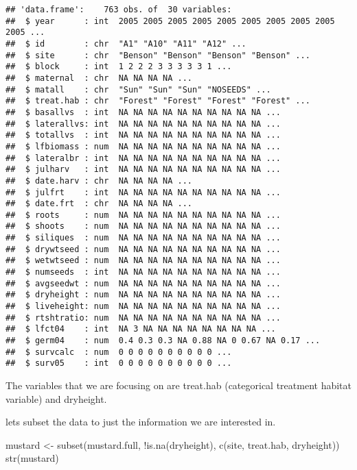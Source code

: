 \documentclass[
]{article}
\newenvironment{Shaded}{\begin{snugshade}}{\end{snugshade}}
\newcommand{\FunctionTok}[1]{\textcolor[rgb]{0.00,0.00,0.00}{#1}}
\newcommand{\NormalTok}[1]{#1}
\newcommand{\OtherTok}[1]{\textcolor[rgb]{0.56,0.35,0.01}{#1}}
\newcommand{\SpecialCharTok}[1]{\textcolor[rgb]{0.00,0.00,0.00}{#1}}
\begin{document}
\begin{verbatim}
## 'data.frame':    763 obs. of  30 variables:
##  $ year      : int  2005 2005 2005 2005 2005 2005 2005 2005 2005 2005 ...
##  $ id        : chr  "A1" "A10" "A11" "A12" ...
##  $ site      : chr  "Benson" "Benson" "Benson" "Benson" ...
##  $ block     : int  1 2 2 2 3 3 3 3 3 1 ...
##  $ maternal  : chr  NA NA NA NA ...
##  $ matall    : chr  "Sun" "Sun" "Sun" "NOSEEDS" ...
##  $ treat.hab : chr  "Forest" "Forest" "Forest" "Forest" ...
##  $ basallvs  : int  NA NA NA NA NA NA NA NA NA NA ...
##  $ laterallvs: int  NA NA NA NA NA NA NA NA NA NA ...
##  $ totallvs  : int  NA NA NA NA NA NA NA NA NA NA ...
##  $ lfbiomass : num  NA NA NA NA NA NA NA NA NA NA ...
##  $ lateralbr : int  NA NA NA NA NA NA NA NA NA NA ...
##  $ julharv   : int  NA NA NA NA NA NA NA NA NA NA ...
##  $ date.harv : chr  NA NA NA NA ...
##  $ julfrt    : int  NA NA NA NA NA NA NA NA NA NA ...
##  $ date.frt  : chr  NA NA NA NA ...
##  $ roots     : num  NA NA NA NA NA NA NA NA NA NA ...
##  $ shoots    : num  NA NA NA NA NA NA NA NA NA NA ...
##  $ siliques  : num  NA NA NA NA NA NA NA NA NA NA ...
##  $ drywtseed : num  NA NA NA NA NA NA NA NA NA NA ...
##  $ wetwtseed : num  NA NA NA NA NA NA NA NA NA NA ...
##  $ numseeds  : int  NA NA NA NA NA NA NA NA NA NA ...
##  $ avgseedwt : num  NA NA NA NA NA NA NA NA NA NA ...
##  $ dryheight : num  NA NA NA NA NA NA NA NA NA NA ...
##  $ liveheight: num  NA NA NA NA NA NA NA NA NA NA ...
##  $ rtshtratio: num  NA NA NA NA NA NA NA NA NA NA ...
##  $ lfct04    : int  NA 3 NA NA NA NA NA NA NA NA ...
##  $ germ04    : num  0.4 0.3 0.3 NA 0.88 NA 0 0.67 NA 0.17 ...
##  $ survcalc  : num  0 0 0 0 0 0 0 0 0 0 ...
##  $ surv05    : int  0 0 0 0 0 0 0 0 0 0 ...
\end{verbatim}

The variables that we are focusing on are treat.hab (categorical
treatment habitat variable) and dryheight.

lets subset the data to just the information we are interested in.

\begin{Shaded}
\begin{Highlighting}[]
\NormalTok{mustard }\OtherTok{\textless{}{-}} \FunctionTok{subset}\NormalTok{(mustard.full, }\SpecialCharTok{!}\FunctionTok{is.na}\NormalTok{(dryheight),}
                  \FunctionTok{c}\NormalTok{(site, treat.hab, dryheight))}
\FunctionTok{str}\NormalTok{(mustard)}
\end{Highlighting}
\end{Shaded}
\end{document}
